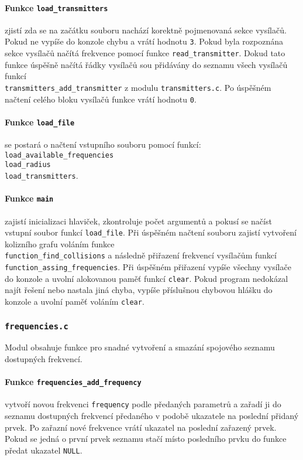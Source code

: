 \documentclass[12pt]{report}
\begin{document}
\cprotect\paragraph{Funkce \verb|load_transmitters|}
zjistí zda se na začátku souboru nachází korektně pojmenovaná sekce vysílačů. Pokud ne vypíše do konzole chybu a vrátí hodnotu \texttt{3}. Pokud byla rozpoznána sekce vysílačů načítá frekvence pomocí funkce \verb|read_transmitter|. Dokud tato funkce úspěšně načítá řádky vysílačů sou přidávány do seznamu všech vysílačů funkcí \\  \verb|transmitters_add_transmitter| z modulu \texttt{transmitters.c}. Po úspěšném načtení celého bloku vysílačů funkce vrátí hodnotu \texttt{0}.

\cprotect\paragraph{Funkce \verb|load_file|}
se postará o načtení vstupního souboru pomocí funkcí:\\
\verb|load_available_frequencies|\\
\verb|load_radius|\\
\verb|load_transmitters|.

\cprotect\paragraph{Funkce \verb|main|}
zajistí inicializaci hlaviček, zkontroluje počet argumentů a pokusí se načíst vstupní soubor funkcí \verb|load_file|. Při úspěšném načtení souboru zajistí vytvoření kolizního grafu voláním funkce \\ \verb|function_find_collisions| a následně přiřazení frekvencí vysílačům funkcí \verb|function_assing_frequencies|. Při úspěšném přiřazení vypíše všechny vysílače do konzole a uvolní alokovanou paměť funkcí \texttt{clear}. Pokud program nedokázal najít řešení nebo nastala jiná chyba, vypíše příslušnou chybovou hlášku do konzole a uvolní paměť voláním \texttt{clear}.

\subsubsection{\Large{\texttt{frequencies.c}}}
Modul obsahuje funkce pro snadné vytvoření a smazání spojového seznamu dostupných frekvencí.

\cprotect\paragraph{Funkce \verb|frequencies_add_frequency|}
vytvoří novou frekvenci \texttt{frequency} podle předaných parametrů a zařadí ji do seznamu dostupných frekvencí předaného v podobě ukazatele na poslední přidaný prvek. Po zařazní nové frekvence vrátí ukazatel na poslední zařazený prvek. Pokud se jedná o první prvek seznamu stačí místo posledního prvku do funkce předat ukazatel \texttt{NULL}.
\end{document}
